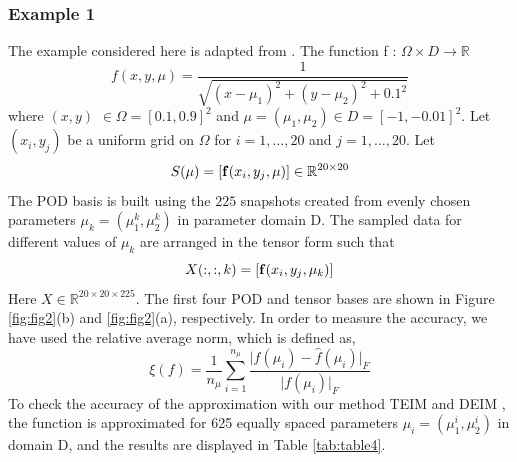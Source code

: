 \documentclass{article}
\begin{document}
\subsubsection{Example 1}
 The example considered here is adapted from \cite{DEIM}. The function f : $\Omega \times D\rightarrow \mathbb{R}$
 \begin{equation*}
     f(x,y,\mu) =\frac{1}{\sqrt{(x-\mu_1)^2+(y-\mu_2)^2+0.1^2}}
  \end{equation*} 
where $(x,y)$ $\in \Omega= [0.1,0.9]^2$ and $\mu = (\mu_1,\mu_2) \in D= [-1,-0.01]^2$. Let $(x_i,y_j)$ be a uniform grid on $\Omega$ for $i=1,\dots,20$ and $j=1,\dots , 20$. Let
 \begin{equation*}
     S(\mu) = [\bold{f}(x_i,y_j,\mu)] \in \mathbb{R}^{20 \times 20}
  \end{equation*} 
  The POD basis is built using the $225$ snapshots created from evenly chosen parameters $\mu_k = (\mu_1^k,\mu_2^k)$ in parameter domain D. The sampled data for different values of $\mu_k$ are arranged in the tensor form such that
  \begin{equation*}
     X(:,:,k) = [\bold{f}(x_i,y_j,\mu_k)] 
  \end{equation*} 
  Here $X \in \mathbb{R}^{20 \times 20 \times 225}$. The first four POD and tensor bases are shown in Figure \ref{fig:fig2}(b) and \ref{fig:fig2}(a), respectively. In order to measure the accuracy, we have used the relative average norm, which is defined as,
 \begin{equation}
      \xi(f)=\frac{1}{n_\mu}\sum_{i=1}^{n_\mu} \frac{\lvert f(\mu_i)-\hat{f}(\mu_i) \rvert_F}{\lvert f(\mu_i)\rvert_F}
\end{equation}
To check the accuracy of the approximation with our method TEIM and DEIM \cite{DEIM}, the function is approximated for 625 equally spaced parameters  $\mu_i = (\mu_1^i,\mu_2^i)$ in domain D, and the results are displayed in Table \ref{tab:table4}.
  
\end{document}
